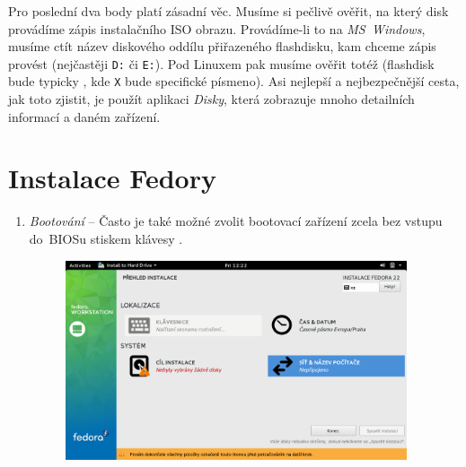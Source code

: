 Pro poslední dva body platí zásadní věc. Musíme si pečlivě ověřit, na který disk provádíme zápis instalačního ISO obrazu. Provádíme-li to na \emph{MS~Windows}, musíme ctít název diskového oddílu přiřazeného flashdisku, kam chceme zápis provést (nejčastěji \texttt{D:} či \texttt{E:}). Pod Linuxem pak musíme ověřit totéž (flashdisk bude typicky , kde \texttt{X} bude specifické písmeno). Asi nejlepší a nejbezpečnější cesta, jak toto zjistit, je použít aplikaci \emph{Disky}, která zobrazuje mnoho detailních informací a daném zařízení.

\section*{Instalace Fedory}
\begin{enumerate}

\item\emph{Bootování} --  Často je také možné zvolit bootovací zařízení zcela bez vstupu do~BIOSu stiskem klávesy .

\begin{figure}[t]
\begin{center}
\includegraphics[width=0.95\textwidth]{img/instalator-b}
 \label{fig:instalator-b}
\end{center}
\end{figure}


\end{enumerate}
